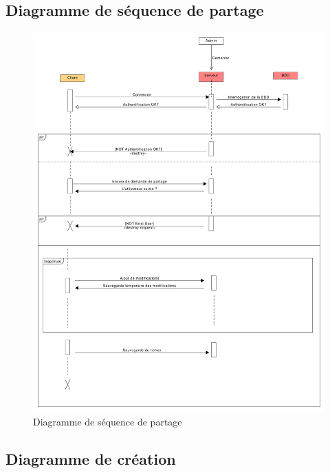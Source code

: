 	\subsection{Diagramme de séquence de partage}
	
	\begin{figure}[hb]
		\vspace*{1em}
		\centering
		\includegraphics[scale=.13]{setup/diagramme_sequence_partage.png}
		
		\caption{Diagramme de séquence de partage}
		\vspace*{1em}
	\end{figure}
	
	\newpage
	
	\subsection{Diagramme de création}
	
